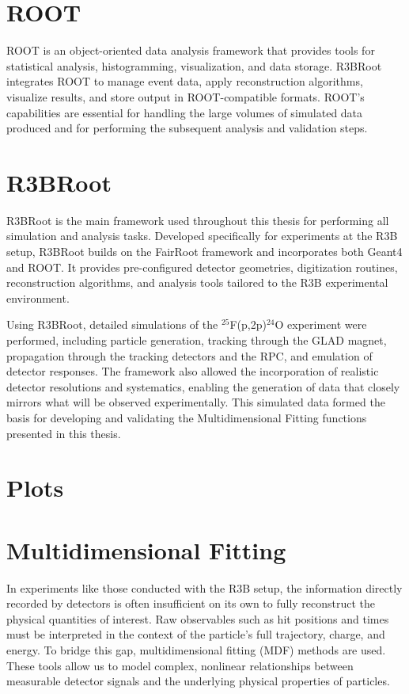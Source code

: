 \section{ROOT}

ROOT \cite{brun_root_1997} is an object-oriented data analysis framework that provides tools for statistical analysis, histogramming, visualization, and data storage. R3BRoot integrates ROOT to manage event data, apply reconstruction algorithms, visualize results, and store output in ROOT-compatible formats. ROOT’s capabilities are essential for handling the large volumes of simulated data produced and for performing the subsequent analysis and validation steps.


\section{R3BRoot}

R3BRoot \cite{bertini_r3broot_2011} is the main framework used throughout this thesis for performing all simulation and analysis tasks. Developed specifically for experiments at the \gls{R3B} setup, R3BRoot builds on the FairRoot framework and incorporates both Geant4 and ROOT. It provides pre-configured detector geometries, digitization routines, reconstruction algorithms, and analysis tools tailored to the \gls{R3B} experimental environment.

Using R3BRoot, detailed simulations of the $^{25}$F(p,2p)$^{24}$O experiment were performed, including particle generation, tracking through the GLAD magnet, propagation through the tracking detectors and the \gls{RPC}, and emulation of detector responses. The framework also allowed the incorporation of realistic detector resolutions and systematics, enabling the generation of data that closely mirrors what will be observed experimentally. This simulated data formed the basis for developing and validating the Multidimensional Fitting functions presented in this thesis.

\section{Plots}

\section{Multidimensional Fitting}

In experiments like those conducted with the \gls{R3B} setup, the information directly recorded by detectors is often insufficient on its own to fully reconstruct the physical quantities of interest. Raw observables such as hit positions and times must be interpreted in the context of the particle’s full trajectory, charge, and energy. To bridge this gap, multidimensional fitting (MDF) methods are used. These tools allow us to model complex, nonlinear relationships between measurable detector signals and the underlying physical properties of particles.

